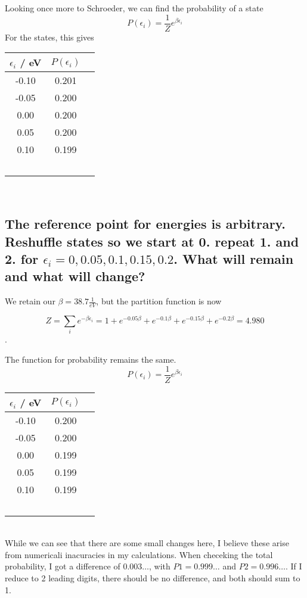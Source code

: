 \documentclass[a4paper,11pt]{article}
\begin{document}
Looking once more to Schroeder, we can find the probability of a state 
\[ P(\epsilon_i ) = \frac{1}{Z} e^{\beta \epsilon_i} \]
For the states, this gives \\
\begin{tabular}{ccc}
\hline
    \multicolumn{1}{c}{ $\epsilon_i$ / eV } & \multicolumn{1}{c}{ $P(\epsilon_i )$ } \\
\hline
  -0.10     &     0.201    \\ 
  -0.05     &     0.200    \\ 
   0.00     &     0.200    \\ 
   0.05     &     0.200    \\ 
   0.10     &     0.199    \\ 
\hline
    \label{probs}
\
\end{tabular}\\


\subsection{ The reference point for energies is arbitrary. Reshuffle states so we start at 0. repeat 1. and 2. for
            $\epsilon_i = 0, 0.05, 0.1, 0.15, 0.2$. What will remain and what will change? }%
We retain our $\beta =  38.7 \frac{1}{eV}$, but the partition function is now

\[ Z = \sum_i e^{-\beta \epsilon_i} = 1 + e^{-0.05\beta} + e^{-0.1\beta} + e^{-0.15\beta} + e^{-0.2\beta} = 4.980 \].

The function for probability remains the same. 
\[ P(\epsilon_i ) = \frac{1}{Z} e^{\beta \epsilon_i } \]

\begin{tabular}{ccc}
\hline
    \multicolumn{1}{c}{ $\epsilon_i$ / eV } & \multicolumn{1}{c}{ $P(\epsilon_i )$ } \\
\hline
  -0.10     &      0.200   \\ 
  -0.05     &      0.200   \\ 
   0.00     &      0.199   \\ 
   0.05     &      0.199   \\ 
   0.10     &      0.199   \\ 
\hline
    \label{probs}
\
\end{tabular}\\

While we can see that there are some small changes here, I believe these arise from numericali inacuracies in my calculations. 
When checeking the total probability, I got a difference of $0.003\dots$, with $P1 = 0.999\dots$ and $P2 = 0.996\dots$. If I reduce
to 2 leading digits, there should be no difference, and both should sum to 1.
\end{document}
